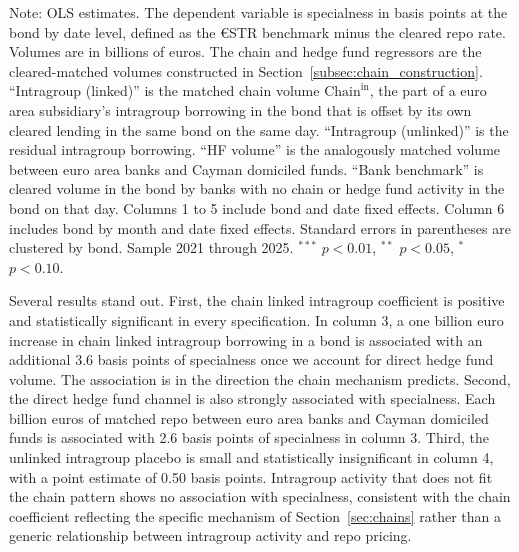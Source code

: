 \documentclass[english, 11pt, oneside, legal]{article}
\begin{document}
\begin{table}[htbp]
    \begin{flushleft}
        \footnotesize Note: OLS estimates. The dependent variable is specialness in basis points at the bond by date level, defined as the \euro{}STR benchmark minus the cleared repo rate. Volumes are in billions of euros. The chain and hedge fund regressors are the cleared-matched volumes constructed in Section~\ref{subsec:chain_construction}. ``Intragroup (linked)'' is the matched chain volume $\text{Chain}^{\text{in}}$, the part of a euro area subsidiary's intragroup borrowing in the bond that is offset by its own cleared lending in the same bond on the same day. ``Intragroup (unlinked)'' is the residual intragroup borrowing. ``HF volume'' is the analogously matched volume between euro area banks and Cayman domiciled funds. ``Bank benchmark'' is cleared volume in the bond by banks with no chain or hedge fund activity in the bond on that day. Columns 1 to 5 include bond and date fixed effects. Column 6 includes bond by month and date fixed effects. Standard errors in parentheses are clustered by bond. Sample 2021 through 2025. $^{***}$ $p<0.01$, $^{**}$ $p<0.05$, $^{*}$ $p<0.10$.
    \end{flushleft}
\end{table}

Several results stand out. First, the chain linked intragroup coefficient is positive and statistically significant in every specification. In column 3, a one billion euro increase in chain linked intragroup borrowing in a bond is associated with an additional 3.6 basis points of specialness once we account for direct hedge fund volume. The association is in the direction the chain mechanism predicts. Second, the direct hedge fund channel is also strongly associated with specialness. Each billion euros of matched repo between euro area banks and Cayman domiciled funds is associated with 2.6 basis points of specialness in column 3. Third, the unlinked intragroup placebo is small and statistically insignificant in column 4, with a point estimate of 0.50 basis points. Intragroup activity that does not fit the chain pattern shows no association with specialness, consistent with the chain coefficient reflecting the specific mechanism of Section~\ref{sec:chains} rather than a generic relationship between intragroup activity and repo pricing.
\end{document}
